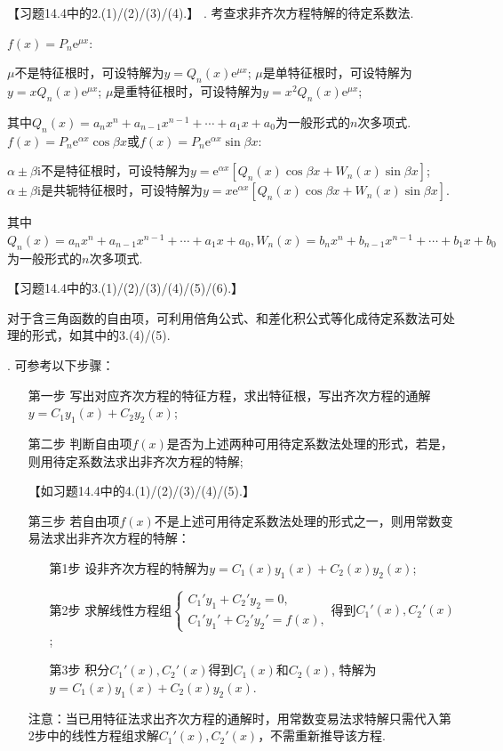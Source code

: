 \documentclass[12pt,UTF8]{ctexart}
\newcommand{\me}[0]{\mathrm e}
\newcommand{\m}[0]{\mathrm }
\begin{document}
\begin{enumerate}
【习题14.4中的2.(1)/(2)/(3)/(4).】
. 考查求非齐次方程特解的待定系数法. 
\begin{enumerate}
$f(x)=P_n\me^{\mu x}$:
\begin{itemize}
$\mu$不是特征根时，可设特解为$y=Q_n(x)\me^{\mu x}$;
$\mu$是单特征根时，可设特解为$y=xQ_n(x)\me^{\mu x}$;
$\mu$是重特征根时，可设特解为$y=x^2Q_n(x)\me^{\mu x}$;
\end{itemize}
其中$Q_n(x)=a_nx^n+a_{n-1}x^{n-1}+\cdots+a_1x+a_0$为一般形式的$n$次多项式.
$f(x)=P_n\me^{\alpha x}\cos\beta x$或$f(x)=P_n\me^{\alpha x}\sin\beta x$:
\begin{itemize}
$\alpha\pm\beta\m i$不是特征根时，可设特解为$y=\me^{\alpha x}[Q_n(x)\cos\beta x+W_n(x)\sin\beta x]$;
$\alpha\pm\beta\m i$是共轭特征根时，可设特解为$y=x\me^{\alpha x}[Q_n(x)\cos\beta x+W_n(x)\sin\beta x]$.
\end{itemize}
其中$Q_n(x)=a_nx^n+a_{n-1}x^{n-1}+\cdots+a_1x+a_0, W_n(x)=b_nx^n+b_{n-1}x^{n-1}+\cdots+b_1x+b_0$为一般形式的$n$次多项式.

【习题14.4中的3.(1)/(2)/(3)/(4)/(5)/(6).】

对于含三角函数的自由项，可利用倍角公式、和差化积公式等化成待定系数法可处理的形式，如其中的3.(4)/(5).
\end{enumerate}
. 可参考以下步骤：
\begin{enumerate}
\item[第一步]写出对应齐次方程的特征方程，求出特征根，写出齐次方程的通解$y=C_1y_1(x)+C_2y_2(x)$;
\item[第二步]判断自由项$f(x)$是否为上述两种可用待定系数法处理的形式，若是，则用待定系数法求出非齐次方程的特解;

【如习题14.4中的4.(1)/(2)/(3)/(4)/(5).】
\item[第三步]若自由项$f(x)$不是上述可用待定系数法处理的形式之一，则用常数变易法求出非齐次方程的特解：
\begin{enumerate}
\item[第1步]设非齐次方程的特解为$y=C_1(x)y_1(x)+C_2(x)y_2(x)$;
\item[第2步]求解线性方程组$\begin{cases}C_1'y_1+C_2'y_2=0,\\C_1'y_1'+C_2'y_2'=f(x),\end{cases}$得到$C_1'(x),C_2'(x)$;
\item[第3步]积分$C_1'(x),C_2'(x)$得到$C_1(x)$和$C_2(x)$, 特解为$y=C_1(x)y_1(x)+C_2(x)y_2(x)$.
\end{enumerate}
注意：当已用特征法求出齐次方程的通解时，用常数变易法求特解只需代入第2步中的线性方程组求解$C_1'(x),C_2'(x)$，不需重新推导该方程.


\end{enumerate}
\end{enumerate}
\end{document}

